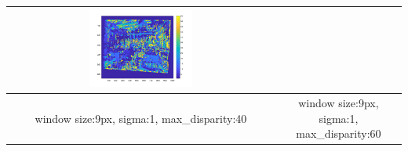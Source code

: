 \begin{longtable}[h!]{|c|c|}
	\includegraphics[width=0.4\textwidth]{../code/win9sig1disp60.png} \\
	\hline
	window size:9px, sigma:1, max\_disparity:40 &window size:9px, sigma:1, max\_disparity:60\\
	\hline
\end{longtable}

